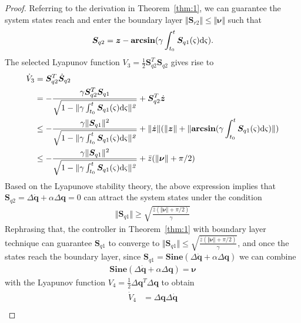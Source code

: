 \documentclass[3p]{elsarticle}
\theoremstyle{plain}
\theoremstyle{remark}
\begin{document}
\begin{proof}
Referring to the derivation in Theorem~\ref{thm:1}, we can guarantee the system states reach and enter the boundary layer $\Vert\bm{ S}_{r2}\Vert \le \Vert\bm\nu\Vert$ such that
\begin{align}
\bm S_{q2}=\bm z-\mathbf{arcsin}(\gamma\int^t_{t_0}\bm S_{q1}(\varsigma) \rm{d}\it{\varsigma}).
\end{align}
The selected Lyapunov function $V_3=\frac{1}{2}\bm{ S}_{q2}^T\bm{ S}_{q2}$ gives rise to
\begin{align}\begin{split}
\dot V_3&=\bm{ S}_{q2}^T\dot{\bm{S}}_{q2}\\
&=-\frac{\gamma \bm S_{q2}^T\bm S_{q1}}{\sqrt{1-\Vert\gamma\int^t_{t_0}\bm S_{q1}(\varsigma) \rm{d}\it{\varsigma\Vert^2}}}+\bm{ S}_{q2}^T\dot{\bm z}\\
&\le -\frac{\gamma \Vert \bm S_{q1}\Vert^2}{\sqrt{1-\Vert\gamma\int^t_{t_0}\bm S_{q1}(\varsigma) \rm{d}\it{\varsigma\Vert^2}}}+\Vert\dot{\bm{z}}\Vert(\Vert\bm z\Vert+\Vert\mathbf{arcsin}(\gamma\int^t_{t_0}\bm S_{q1}(\varsigma) \rm{d}\it{\varsigma})\Vert)\\
&\le -\frac{\gamma \Vert \bm S_{q1}\Vert^2}{\sqrt{1-\Vert\gamma\int^t_{t_0}\bm S_{q1}(\varsigma) \rm{d}\it{\varsigma\Vert^2}}}+\bar z(\Vert\bm{\nu}\Vert+\pi/2)\\
\end{split}\end{align}
Based on the Lyapunove stability theory, the above expression implies that $\bm S_{q2} = \Delta \dot {\bm q}+\alpha \Delta \bm q=0$ can attract the system states under the condition
\begin{align}
  \Vert \bm S_{q1}\Vert\ge\sqrt{\frac{\bar z(\Vert\bm{\nu}\Vert+\pi/2)}{\gamma}}
\end{align} Rephrasing that, the controller in Theorem~\ref{thm:1} with boundary layer technique can guarantee $\bm S_{q1}$ to converge to $\Vert\bm S_{q1}\Vert\le\sqrt{\frac{\bar z(\Vert\bm{\nu}\Vert+\pi/2)}{\gamma}}$, and once the states reach the boundary layer, since $\bm S_{q1}=\mathbf{Sine}(\Delta\dot{\bm q}+\alpha\Delta\bm q)$ we can combine
\begin{align}
  \mathbf{Sine}(\Delta\dot{\bm q}+\alpha\Delta\bm q)=\bm\nu
\end{align}
with the Lyapunov function $V_4=\frac{1}{2}\Delta\bm q^T\Delta\bm q$ to obtain
\begin{align}\begin{split}
\dot V_4 &= \Delta\bm q\Delta\dot{\bm q}\\

\end{split}
\end{align}
\end{proof}
\end{document}

